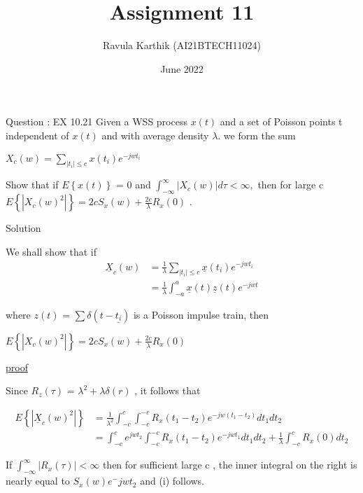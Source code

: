 \documentclass[journal,12pt,twocolumn]{beamer}
\title{Assignment 11}
\author{Ravula Karthik (AI21BTECH11024)}
\date {June 2022}
\providecommand{\brak}[1]{\ensuremath{\left(#1\right)}}
\providecommand{\cbrak}[1]{\ensuremath{\left\{#1\right\}}}
\begin{document}
	\begin{frame}
		\titlepage 
	\end{frame}
	
	\begin{frame}{Question : EX 10.21}
		Given a WSS process $x(t)$ and a set of Poisson points t independent of $x(t)$ and with
		average density $\lambda$. we form the sum
		
		$ X_c\brak{w} = \sum_{|t_i|\leq c} x\brak{t_i} e^{-jwt_i} $
		
		Show that if $E\cbrak{x(t)}$ = 0 and $\int_{-\infty}^{\infty} |{X_c(w)}| d\tau < \infty,$ then for large c 
		$E\cbrak{|{X_c(w)}^2|} = 2cS_x(w) + \frac{2c}{\lambda}R_x(0)$ .
		
	\end{frame}
	\begin{frame}{Solution}
	
	We shall show that if
	\begin{align}
		\underline{X}_c(w) &= \frac{1}{\lambda}\sum_{|{t_i}| \leq c}\underline{x}\brak{t_i} e^{-jwt_i} \nonumber \\
		&= \frac{1}{\lambda}\int_{-a}^{a}\underline{x}\brak{t}\underline{z}\brak{t}e^{-jwt} \nonumber
	\end{align}
	
	where $z(t)$ = $\sum \delta(t-\underline{t_i}) $ is a Poisson impulse train, then
	
	$E\cbrak{|{X_c(w)}^2|} = 2cS_x(w) + \frac{2c}{\lambda}R_x(0)$
	
	\end{frame}
	
	\begin{frame}
	\underline{proof} 
	
	Since $R_z(\tau)$ = $\lambda^2 +\lambda\delta(r) $ , it follows that
	
	\begin{align}
		E\cbrak{|{\underline{X}_c(w)^2}|} &= \frac{1}{\lambda^2}\int_{-c}^{c}\int_{-c}^{-c} R_x(t_1-t_2)e^{-jw(t_1-t_2)}dt_1dt_2 \\
		&= \int_{-c}^{c} e^{jwt_2}\int_{-c}^{-c} R_x(t_1-t_2)e^{-jwt_1}dt_1dt_2 +\frac{1}{\lambda}\int_{-c}^{c}R_x(0)dt_2
	\end{align} 
	
	If $\int_{-\infty}^{\infty}|{R_x(\tau)}| < \infty$ then for sufficient large c , the inner integral on the right is nearly equal to $S_x(w)e^-jwt_2 $ and (i) follows.
	
	\end{frame}
	
	
\end{document}
